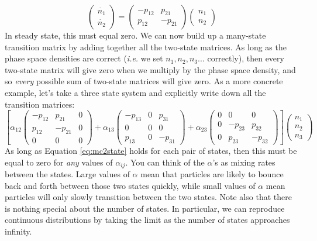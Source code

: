 \documentclass[letterpaper,11pt,preprint]{aastex}
\begin{document}
\begin{equation}
\begin{pmatrix}
 \dot{n_1} \\
\dot{n_2}
\end{pmatrix}
=
\begin{pmatrix}
-p_{12} & p_{21} \\
p_{12} & -p_{21}
\end{pmatrix}
\begin{pmatrix}
 n_1 \\
n_2
\end{pmatrix}
\end{equation}
In steady state, this must equal zero.  We can now build up a
many-state transition matrix by adding together all the two-state
matrices.  As long as the phase space densities are correct
(\textit{i.e.} we set $n_1, n_2, n_3...$ correctly), then every
two-state matrix will give zero when we multiply by the phase space
density, and so \textit{every} possible sum of two-state matrices will give
zero.  As a more concrete example, let's take a three state system and
explicitly write down all the transition matrices:
\begin{equation}
\left [
\alpha_{12}
\begin{pmatrix}
-p_{12} & p_{21} & 0 \\
p_{12} & -p_{21} & 0 \\
0 & 0 & 0
\end{pmatrix}
+\alpha_{13}
\begin{pmatrix}
-p_{13} & 0 & p_{31} \\
0 & 0 & 0 \\
p_{13} & 0 &-p_{31}
\end{pmatrix}
+\alpha_{23}
\begin{pmatrix}
0 & 0 & 0 \\
0 & -p_{23} & p_{32} \\
0 & p_{23} & -p_{32}
\end{pmatrix}
\right ]
\begin{pmatrix}
n_1 \\
n_2 \\
n_3
\end{pmatrix}
\end{equation}
As long as Equation \ref{eq:mc2state} holds for each pair of states,
then this must be equal to zero for \textit{any} values of $\alpha_{ij}$.
You can think of the $\alpha$'s as mixing rates between the states.
Large values of $\alpha$ mean that particles are likely to bounce back
and forth between those two states quickly, while small values of
$\alpha$ mean particles will only slowly transition between the two
states.  Note also that there is nothing special about the number of
states.  In particular, we can reproduce continuous distributions by
taking the limit as the number of states approaches infinity.  
\end{document}
